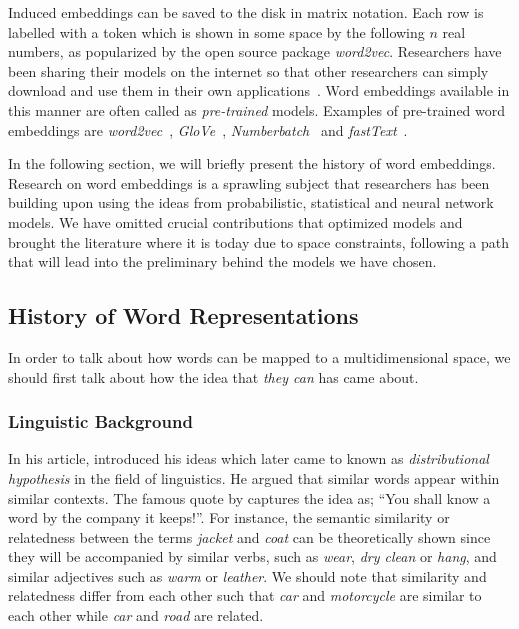 Induced embeddings can be saved to the disk in matrix notation.
Each row is labelled with a token which is shown in some space by the following $n$ real numbers, as popularized by the open source package \emph{word2vec}.
Researchers have been sharing their models on the internet so that other researchers can simply download and use them in their own applications~\cite{balikas_cross-lingual_2018, kusner_word_2015, speer_conceptnet_2017}.
Word embeddings available in this manner are often called as \emph{pre-trained} models.
Examples of pre-trained word embeddings are \emph{word2vec}~\cite{mikolov_distributed_2013}, \emph{GloVe}~\cite{pennington_glove_2014}, \emph{Numberbatch}~\cite{speer_conceptnet_2017} and \emph{fastText}~\cite{bojanowski_enriching_2016}.

In the following section, we will briefly present the history of word embeddings.
Research on word embeddings is a sprawling subject that researchers has been building upon using the ideas from probabilistic, statistical and neural network models.
We have omitted crucial contributions that optimized models and brought the literature where it is today due to space constraints, following a path that will lead into the preliminary behind the models we have chosen.

\subsection{History of Word Representations}%
\label{sub:history_of_word_representations}

In order to talk about how words can be mapped to a multidimensional space, we should first talk about how the idea that \emph{they can} has came about.

\subsubsection{Linguistic Background}%
\label{ssub:linguistic_background}

In his \citeyear{harris_distributional_1954} article, \textcite{harris_distributional_1954} introduced his ideas which later came to known as \emph{distributional hypothesis} in the field of linguistics.
He argued that similar words appear within similar contexts.
The famous quote by \textcite{firth_synopsis_1957} captures the idea as; \enquote{You shall know a word by the company it keeps!}.
For instance, the semantic similarity or relatedness between the terms \emph{jacket} and \emph{coat} can be theoretically shown since they will be accompanied by similar verbs, such as \emph{wear}, \emph{dry clean} or \emph{hang}, and similar adjectives such as \emph{warm} or \emph{leather}.
We should note that similarity and relatedness differ from each other such that \emph{car} and \emph{motorcycle} are similar to each other while \emph{car} and \emph{road} are related.


